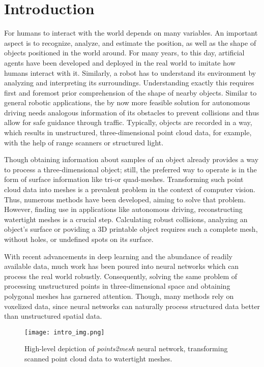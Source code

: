 \chapter{Introduction}
  For humans to interact with the world depends on many variables. 
  An important aspect is to recognize, analyze, and estimate the position,
  as well as the shape of objects positioned in the world around. For many years,
  to this day, artificial agents have been developed and deployed in the real world\cite{1087032,10.1007978-981-13-0224-4_40} 
  to imitate how humans interact with it. Similarly, a robot has to understand its environment
  by analyzing and interpreting its surroundings. Understanding exactly this requires first and 
  foremost prior comprehension of the shape of nearby objects. 
  Similar to general robotic applications, the by now more feasible solution for autonomous driving
  needs analogous information of its obstacles to prevent collisions and thus allow for safe guidance
  through traffic. 
  Typically, objects are recorded in a way, which results in unstructured, three-dimensional point
  cloud data, for example, with the help of range scanners or structured light.

  Though obtaining information about samples of an object already provides a way to process a three-dimensional object;
  still, the preferred way to operate is in the form of surface information like tri-or quad-meshes.
  Transforming such point cloud data into meshes is a prevalent problem in the context of computer vision. Thus, numerous
  methods have been developed, aiming to solve that problem\cite{817351,Jakob2015Instant}.
  However, finding use in applications like autonomous driving, reconstructing watertight meshes is a crucial step. Calculating robust collisions,
  analyzing an object's surface or poviding a 3D printable object requires such a complete mesh, without holes, or undefined spots on its surface.
 
  With recent advancements in deep learning and the abundance of readily available data, much work has been poured
  into neural networks which can process the real world robustly. Consequently, solving the same problem of processing 
  unstructured points in three-dimensional space and obtaining polygonal meshes has garnered attention. Though, many methods 
  rely on voxelized data, since neural networks can naturally process structured data better than unstructured spatial data.

  \begin{figure}[htbp]
    \centering
    \texttt{[image: intro\_img.png]}
    \caption{High-level depiction of \emph{points2mesh} neural network, transforming scanned point cloud data to watertight meshes.} \label{fig:intro}
  \end{figure}

